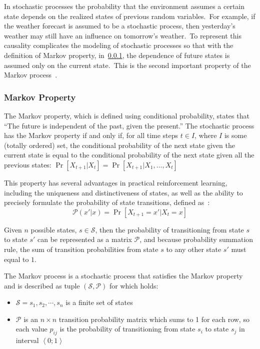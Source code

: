\documentclass[../xlapes02]{subfiles}
\begin{document}
    In stochastic processes the probability that the environment assumes a certain state depends on the realized states of previous random variables.\ For example, if the weather forecast is assumed to be a stochastic process, then yesterday’s weather may still have an influence on tomorrow’s weather.\ To represent this causality complicates the modeling of stochastic processes so that with the definition of Markov property, in~\cref{subsubsec:markov-property}, the dependence of future states is assumed only on the current state.\ This is the second important property of the Markov process~\cite{FITMT25127}.

    \subsubsection{Markov Property}\label{subsubsec:markov-property}
    The Markov property, which is defined using conditional probability, states that ``The future is independent of the past, given the present.''
    The stochastic process has the Markov property if and only if, for all time steps $t \in I$, where $I$ is some (totally ordered) set, the conditional probability of the next state given the current state is equal to the conditional probability of the next state given all the previous states: $\Pr\left[X_{t+1}|X_t\right] = \Pr\left[X_{t+1}|X_1,\ldots,X_t\right]$

    This property has several advantages in practical reinforcement learning, including the uniqueness and distinctiveness of states, as well as the ability to precisely formulate the probability of state transitions, defined as~\cite{FITMT25127}:
    \begin{equation}
        \label{eq:markov-property}
        \mathcal{P}(x'|x)=\Pr\left[X_{t+1}=x'|X_t=x\right]
    \end{equation}

    Given $n$ possible states, $s\in \mathcal{S}$, then the probability of transitioning from state $s$ to state $s'$ can be represented as a matrix $\mathcal{P}$, and because probability summation rule, the sum of transition probabilities from state $s$ to any other state $s'$ must equal to $1$.

    \begin{definition}
        The Markov process is a stochastic process that satisfies the Markov property and is described as tuple $\left(\mathcal{S}, \mathcal{P}\right)$ for which holds:\cite{ABATE2021102207}
        \begin{itemize}
            \item $\mathcal{S}=s_1,s_2,\cdots,s_n$ is a finite set of states
            \item $\mathcal{P}$ is an $n\times n$ transition probability matrix which sums to 1 for each row, so each value $p_{ij}$ is the probability of transitioning from state $s_i$ to state $s_j$ in interval $\left< 0;1 \right>$
        \end{itemize}
    \end{definition}
\end{document}
